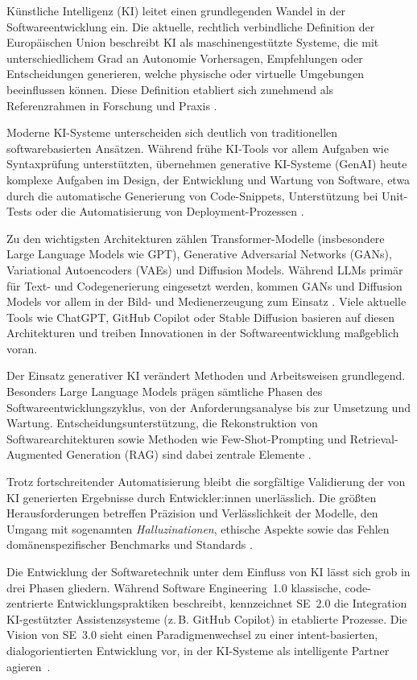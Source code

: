 
Künstliche Intelligenz (KI) leitet einen grundlegenden Wandel in der
Softwareentwicklung ein. Die aktuelle, rechtlich verbindliche Definition der
Europäischen Union beschreibt KI als maschinengestützte Systeme, die mit
unterschiedlichem Grad an Autonomie Vorhersagen, Empfehlungen oder
Entscheidungen generieren, welche physische oder virtuelle Umgebungen
beeinflussen können. Diese Definition etabliert sich zunehmend als
Referenzrahmen in Forschung und Praxis \cite{noauthor_verordnung_nodate}.

Moderne KI-Systeme unterscheiden sich deutlich von traditionellen
softwarebasierten Ansätzen. Während frühe KI-Tools vor allem Aufgaben wie
Syntaxprüfung unterstützten, übernehmen generative KI-Systeme (GenAI) heute
komplexe Aufgaben im Design, der Entwicklung und Wartung von Software, etwa
durch die automatische Generierung von Code-Snippets, Unterstützung bei
Unit-Tests oder die Automatisierung von Deployment-Prozessen
\cite{donvir_role_2024}.

Zu den wichtigsten Architekturen zählen Transformer-Modelle (insbesondere Large
Language Models wie GPT), Generative Adversarial Networks (GANs), Variational
Autoencoders (VAEs) und Diffusion Models. Während LLMs primär für Text- und
Codegenerierung eingesetzt werden, kommen GANs und Diffusion Models vor allem
in der Bild- und Medienerzeugung zum Einsatz \cite{donvir_role_2024}. Viele
aktuelle Tools wie ChatGPT, GitHub Copilot oder Stable Diffusion basieren auf
diesen Architekturen und treiben Innovationen in der Softwareentwicklung
maßgeblich voran.

Der Einsatz generativer KI verändert Methoden und Arbeitsweisen grundlegend.
Besonders Large Language Models prägen sämtliche Phasen des
Softwareentwicklungszyklus, von der Anforderungsanalyse bis zur Umsetzung und
Wartung. Entscheidungsunterstützung, die Rekonstruktion von
Softwarearchitekturen sowie Methoden wie Few-Shot-Prompting und
Retrieval-Augmented Generation (RAG) sind dabei zentrale Elemente
\cite{esposito_generative_2025}.

Trotz fortschreitender Automatisierung bleibt die sorgfältige Validierung der
von KI generierten Ergebnisse durch Entwickler:innen unerlässlich. Die größten
Herausforderungen betreffen Präzision und Verlässlichkeit der Modelle, den
Umgang mit sogenannten \textit{Halluzinationen}, ethische Aspekte sowie das
Fehlen domänenspezifischer Benchmarks und Standards
\cite{esposito_generative_2025}.

Die Entwicklung der Softwaretechnik unter dem Einfluss von KI lässt sich grob
in drei Phasen gliedern. Während Software Engineering~1.0 klassische,
code-zentrierte Entwicklungspraktiken beschreibt, kennzeichnet SE~2.0 die
Integration KI-gestützter Assistenzsysteme (z.\,B. GitHub Copilot) in
etablierte Prozesse. Die Vision von SE~3.0 sieht einen Paradigmenwechsel zu
einer intent-basierten, dialogorientierten Entwicklung vor, in der KI-Systeme
als intelligente Partner agieren~\cite{hassan_towards_2024}.

